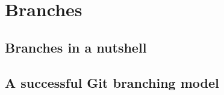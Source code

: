 \chapter{Branches}

\section{Branches in a nutshell}


\section{A successful Git branching model}




